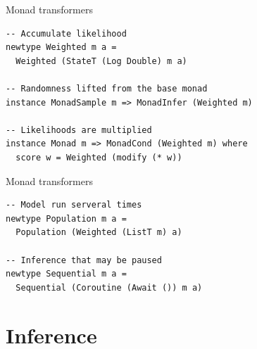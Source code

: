 \documentclass[usenames,dvipsnames,10pt]{beamer}
\begin{document}
\begin{frame}[fragile]{Monad transformers}
\begin{verbatim}
-- Accumulate likelihood
newtype Weighted m a =
  Weighted (StateT (Log Double) m a)
    
-- Randomness lifted from the base monad
instance MonadSample m => MonadInfer (Weighted m)

-- Likelihoods are multiplied
instance Monad m => MonadCond (Weighted m) where
  score w = Weighted (modify (* w))
\end{verbatim}
\end{frame}

\begin{frame}[fragile]{Monad transformers}
\begin{verbatim}
-- Model run serveral times
newtype Population m a =
  Population (Weighted (ListT m) a)

-- Inference that may be paused
newtype Sequential m a =
  Sequential (Coroutine (Await ()) m a)
\end{verbatim}
\end{frame}

\section{Inference}
\end{document}
